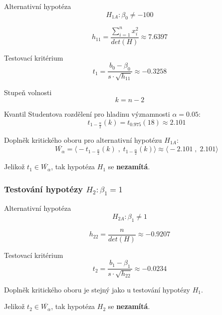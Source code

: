 \begin{compactitem}
    \item Alternativní hypotéza $${\displaystyle H_{1A} : \beta_0 \neq -100}$$

    $${\displaystyle h_{11} = \frac{\sum\limits_{i=1}^n x_i^2} {det(H)} \approx 7.6397}$$

    \item Testovací kritérium
    $${\displaystyle t_1 = \frac{b_0 - \beta_0}{s \cdot \sqrt{h_{11}}} \approx -0.3258}$$

    \item Stupeň volnosti
    $${\displaystyle k = n - 2}$$

    \item Kvantil Studentova rozdělení pro hladinu významnosti ${\displaystyle \alpha = 0.05}$:
    $${\displaystyle \qquad t_{1 - \frac{\alpha}{2}}(k) = t_{0.975}(18) \approx 2.101}$$

    \item Doplněk kritického oboru pro alternativní hypotézu ${\displaystyle H_{1A}}$:
    $${\displaystyle \qquad \overline{W_\alpha} = \big\langle -t_{1 - \frac{\alpha}{2}}(k) \;,\; t_{1 - \frac{\alpha}{2}}(k) \big\rangle \approx \big\langle -2.101 \;,\; 2.101 \big\rangle}$$

    \item Jelikož ${\displaystyle t_1 \in \overline{W_\alpha}}$, tak hypotéza ${\displaystyle H_1}$ se \textbf{nezamítá}.
\end{compactitem}

\subsubsection*{Testování hypotézy ${\displaystyle H_2 : \beta_1 = 1}$}

\begin{compactitem}
    \item Alternativní hypotéza
    $${\displaystyle H_{2A} : \beta_1 \neq 1}$$

    $${\displaystyle h_{22} = \frac{n} {det(H)} \approx -0.9207}$$

    \item Testovací kritérium
    $${\displaystyle t_2 = \frac{b_1 - \beta_1}{s \cdot \sqrt{h_{22}}} \approx -0.0234}$$

    \item Doplněk kritického oboru je stejný jako u testování hypotézy ${\displaystyle H_1}$.

    \item Jelikož ${\displaystyle t_2 \in \overline{W_\alpha}}$, tak hypotéza ${\displaystyle H_2}$ se \textbf{nezamítá}.

\end{compactitem}

